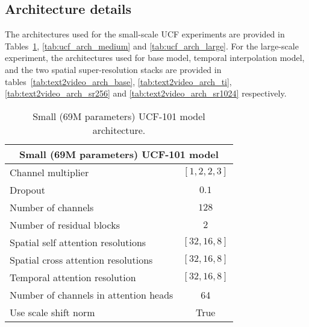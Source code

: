 \documentclass[10pt,twocolumn,letterpaper]{article}
\begin{document}
\subsection{Architecture details}
The architectures used for the small-scale UCF experiments are provided in Tables~\ref{tab:ucf_arch_small}, \ref{tab:ucf_arch_medium} and \ref{tab:ucf_arch_large}. For the large-scale experiment, the architectures used for base model, temporal interpolation model, and the two spatial super-resolution stacks are provided in tables~\ref{tab:text2video_arch_base}, \ref{tab:text2video_arch_ti}, \ref{tab:text2video_arch_sr256} and \ref{tab:text2video_arch_sr1024} respectively.


\label{sec:architecture_details}





\renewcommand{\arraystretch}{1}


\begin{table}[!ht]
    \centering
    \caption{Small (69M parameters) UCF-101 model architecture.}
    \vspace{-1mm}
    \label{tab:ucf_arch_small}
    \begin{tabular}{l c}
        \toprule
        \multicolumn{2}{c}{Small (69M parameters) UCF-101 model}\\
        \midrule
        Channel multiplier & $[1, 2, 2, 3]$ \\
        Dropout & $0.1$ \\
        Number of channels & $128$ \\
        Number of residual blocks & $2$ \\
        Spatial self attention resolutions & $[32, 16, 8]$ \\
        Spatial cross attention resolutions & $[32, 16, 8]$ \\
        Temporal attention resolution & $[32, 16, 8]$ \\
        Number of channels in attention heads & 64\\
        Use scale shift norm & True \\
        \bottomrule
    \end{tabular}
\end{table}
\end{document}
